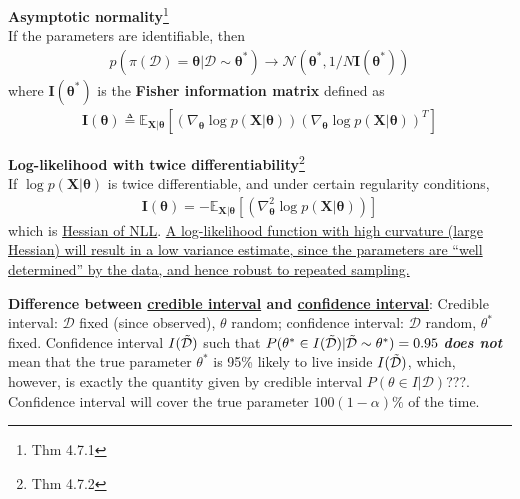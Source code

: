 \begin{theorem}\label{thm:asymnorm}
    \textbf{Asymptotic normality}\footnote{
    \citep{pml1Book} Thm 4.7.1
    }\\
    If the parameters are identifiable, then
    \begin{gather}
        p(\pi(\mathcal{D})=\bm{\theta}|\mathcal{D}\sim\bm{\theta}^*)
        \to
        \mathcal{N}(\bm{\theta}^*,1/N\mathbf{I}(\bm{\theta}^*))
    \end{gather}
    where $\mathbf{I}(\bm{\theta}^*)$ is the \textbf{Fisher information matrix} defined as
    \begin{gather}
        \mathbf{I}(\bm{\theta})
        \triangleq\mathbb{E}_{\bm{X}|\bm{\theta}}\left[ 
            (\nabla_{\bm{\theta}}\log{p(\bm{X}|\bm{\theta})})
            (\nabla_{\bm{\theta}}\log{p(\bm{X}|\bm{\theta})})^T
        \right]
    \end{gather}
\end{theorem}

\begin{theorem}
    \textbf{Log-likelihood with twice differentiability}\footnote{
    \citep{pml1Book} Thm 4.7.2
    }\\
    If $\log p(\bm{X}|\bm{\theta})$ is twice differentiable, and under certain regularity conditions,
    \begin{gather}
        \mathbf{I}(\bm{\theta})
        =-\mathbb{E}_{\bm{X}|\bm{\theta}}\left[ 
            (\nabla_{\bm{\theta}}^2\log{p(\bm{X}|\bm{\theta})})
        \right]
    \end{gather}
    which is \uline{Hessian of NLL}.
    \uline{A log-likelihood function with high curvature (large Hessian) will result in
    a low variance estimate, since the parameters are ``well determined'' by the data,
    and hence robust to repeated sampling.}
\end{theorem}



\textbf{Difference between \uline{credible interval} and \uline{confidence interval}}:
Credible interval: $\mathcal{D}$ fixed (since observed), $\theta$ random;
confidence interval: $\mathcal{D}$ random, $\theta^*$ fixed.
Confidence interval $I(\Tilde{\mathcal{D}})$ such that $P(\theta^*\in I(\Tilde{\mathcal{D}})|\Tilde{\mathcal{D}}\sim\theta^*)=0.95$ \textbf{\textit{does not}} mean that
the true parameter $\theta^*$ is 95\% likely to live inside $I(\Tilde{\mathcal{D}})$, 
which, however, is exactly the quantity given by credible interval {\color{red}$P(\theta\in I|\mathcal{D})$???}.
Confidence interval will cover the true parameter $100(1-\alpha)\%$ of the time.

